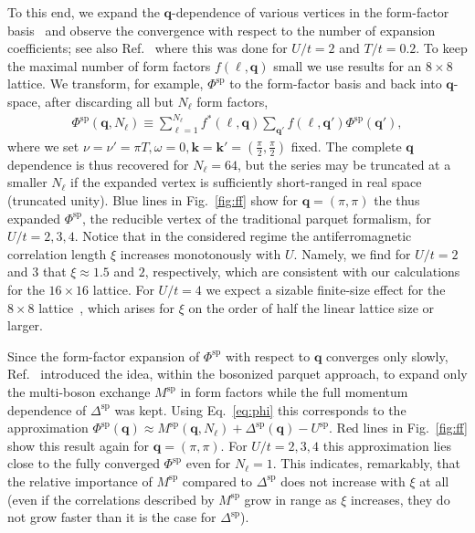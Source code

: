 \documentclass[epj]{svjour}
\newcommand{\kv}{\ensuremath{\mathbf{k}}}
\newcommand{\qv}{\ensuremath{\mathbf{q}}}
\newcommand{\sz}{\ensuremath{\text{sp}}}
\begin{document}
To this end, we expand the $\qv$-dependence of various vertices in the form-factor basis~\cite{Eckhardt20}
and observe the convergence with respect to the number of expansion coefficients;
see also Ref.~\cite{Krien21-2} where this was done for $U/t=2$ and $T/t=0.2$.
To keep the maximal number of form factors $f(\ell,\qv)$ small we use results for an $8\times8$ lattice.
We transform, for example, $\Phi^\sz$ to the form-factor basis and back into $\qv$-space,
after discarding all but $N_\ell$ form factors,
\begin{align}
\Phi^\sz(\qv,N_\ell)\equiv
\sum_{\ell=1}^{N_\ell}f^*(\ell,\qv)\sum_{\qv'} f(\ell,\qv')\Phi^\sz(\qv'),
\end{align}
where we set $\nu=\nu'=\pi T, \omega=0, \kv=\kv'=(\frac{\pi}{2},\frac{\pi}{2})$ fixed.
The complete $\qv$ dependence is thus recovered for $N_\ell=64$,
but the series may be truncated at a smaller $N_\ell$ if the
expanded vertex is sufficiently short-ranged in real space (truncated unity).
Blue lines in Fig.~\ref{fig:ff} show for $\qv=(\pi,\pi)$ the thus expanded $\Phi^\sz$,
the reducible vertex of the traditional parquet formalism, for $U/t=2,3,4$.
Notice that in the considered regime the antiferromagnetic
correlation length $\xi$ increases monotonously with $U$.
{Namely, we find for $U/t=2$ and $3$ that $\xi\approx1.5$ and $2$, respectively,
which are consistent with our calculations for the $16\times16$ lattice.
For $U/t=4$ we expect a sizable finite-size effect for the $8\times8$ lattice~\cite{Klett20},
which arises for $\xi$ on the order of half the linear lattice size or larger.}

Since the form-factor expansion of $\Phi^\sz$ with respect to $\qv$ converges only slowly,
Ref.~\cite{Krien20} introduced the idea, within the bosonized parquet approach,
to expand only the multi-boson exchange $M^\sz$ in form factors
while the full momentum dependence of $\Delta^\sz$ was kept.
Using Eq.~\eqref{eq:phi} this corresponds to the approximation
$\Phi^\sz(\qv)\approx M^\sz(\qv,N_\ell)+\Delta^\sz(\qv)-U^\sz$.
Red lines in Fig.~\ref{fig:ff} show this result again for $\qv=(\pi,\pi)$.
For $U/t=2,3,4$ this approximation lies close to the fully converged $\Phi^\sz$ even for $N_\ell=1$.
This indicates, remarkably, that the relative importance of $M^\sz$ compared to $\Delta^\sz$
does not increase with $\xi$ at all
(even if the correlations described by $M^\sz$ grow in range as $\xi$ increases,
they do not grow faster than it is the case for $\Delta^\sz$).
\end{document}
